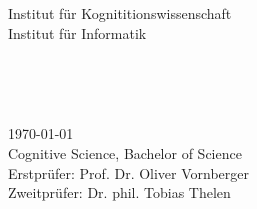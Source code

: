 \begin{titlepage}
\begin{addmargin}[-1cm]{-3cm}
\begin{center}
      Institut für Kognititionswissenschaft \\ \medskip
      Institut für Informatik

      \vfill

      \Large
       \\
      \bigskip

      \begingroup
        \LARGE
        \color{Maroon} \\
        \bigskip
      \endgroup

      \Large

      \vfill
      \vfill
    \end{center}

    \today \\
    Cognitive Science, Bachelor of Science \\
    Erstprüfer: Prof. Dr. Oliver Vornberger \\
    Zweitprüfer: Dr. phil. Tobias Thelen \\
  \end{addmargin}
\end{titlepage}
